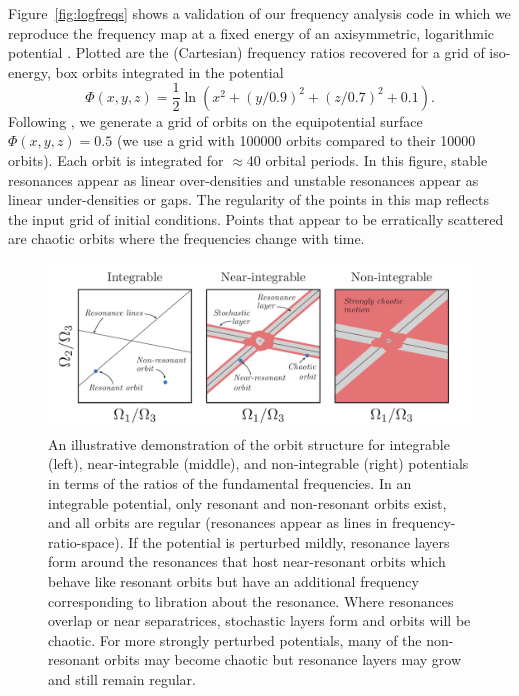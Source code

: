 \documentclass[letterpaper,12pt,preprint]{aastex}
\begin{document}
Figure~\ref{fig:logfreqs} shows a validation of our frequency analysis code in which we reproduce the frequency map at a fixed energy of an axisymmetric, logarithmic potential \cite[][pg. 260, Figure~3.45]{binneytremaine}. Plotted are the (Cartesian) frequency ratios recovered for a grid of iso-energy, box orbits integrated in the potential
\begin{equation}
	\Phi(x,y,z) = \frac{1}{2}\ln\left(x^2 + (y/0.9)^2 + (z/0.7)^2 + 0.1\right). \label{eq:logpotential}
\end{equation}
Following \cite{binneytremaine}, we generate a grid of orbits on the equipotential surface $\Phi(x,y,z) = 0.5$ (we use a grid with 100000 orbits compared to their 10000 orbits). Each orbit is integrated for $\approx$40 orbital periods. In this figure, stable resonances appear as linear over-densities and unstable resonances appear as linear under-densities or gaps. The regularity of the points in this map reflects the input grid of initial conditions. Points that appear to be erratically scattered are chaotic orbits where the frequencies change with time.


\renewcommand{\thefigure}{\arabic{figure}}
\setcounter{figure}{0}

\begin{figure}[!p]
\begin{center}
\includegraphics[width=\textwidth]{figures/cartoons.pdf}
\caption{An illustrative demonstration of the orbit structure for integrable (left), near-integrable (middle), and non-integrable (right) potentials in terms of the ratios of the fundamental frequencies. In an integrable potential, only resonant and non-resonant orbits exist, and all orbits are regular (resonances appear as lines in frequency-ratio-space). If the potential is perturbed mildly, resonance layers form around the resonances that host near-resonant orbits which behave like resonant orbits but have an additional frequency corresponding to libration about the resonance. Where resonances overlap or near separatrices, stochastic layers form and orbits will be chaotic. For more strongly perturbed potentials, many of the non-resonant orbits may become chaotic but resonance layers may grow and still remain regular. } 
\label{fig:cartoons}
\end{center}
\end{figure}
\end{document}
